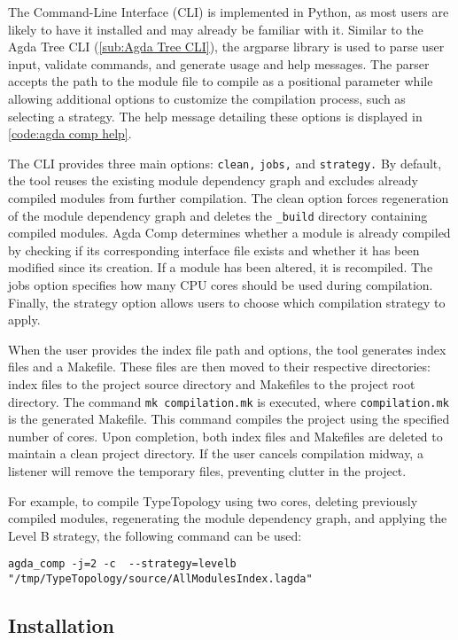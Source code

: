 The Command-Line Interface (CLI) is implemented in Python, as most users are
likely to have it installed and may already be familiar with it. Similar to the
Agda Tree CLI (\cref{sub:Agda Tree CLI}), the argparse library is used to parse
user input, validate commands, and generate usage and help messages. The parser
accepts the path to the module file to compile as a positional parameter while
allowing additional options to customize the compilation process, such as
selecting a strategy. The help message detailing these options is displayed in
\cref{code:agda comp help}.

The CLI provides three main options: \texttt{clean,} \texttt{jobs,} and
\texttt{strategy.} By default, the tool reuses the existing module dependency
graph and excludes already compiled modules from further compilation. The clean
option forces regeneration of the module dependency graph and deletes the
\texttt{\_build} directory containing compiled modules. Agda Comp determines
whether a module is already compiled by checking if its corresponding interface
file exists and whether it has been modified since its creation. If a module
has been altered, it is recompiled. The jobs option specifies how many CPU
cores should be used during compilation. Finally, the strategy option allows
users to choose which compilation strategy to apply.


When the user provides the index file path and options, the tool
generates index files and a Makefile. These files are then moved to their
respective directories: index files to the project source directory and
Makefiles to the project root directory. The command \texttt{mk compilation.mk} is
executed, where \texttt{compilation.mk} is the generated Makefile. This command
compiles the project using the specified number of cores. Upon completion, both
index files and Makefiles are deleted to maintain a clean project directory. If
the user cancels compilation midway, a listener will remove the temporary
files, preventing clutter in the project.


For example, to compile TypeTopology using two cores, deleting previously
compiled modules, regenerating the module dependency graph, and applying the
Level B strategy, the following command can be used:

\begin{lstlisting}
agda_comp -j=2 -c  --strategy=levelb "/tmp/TypeTopology/source/AllModulesIndex.lagda"
\end{lstlisting}

\subsection{Installation}


